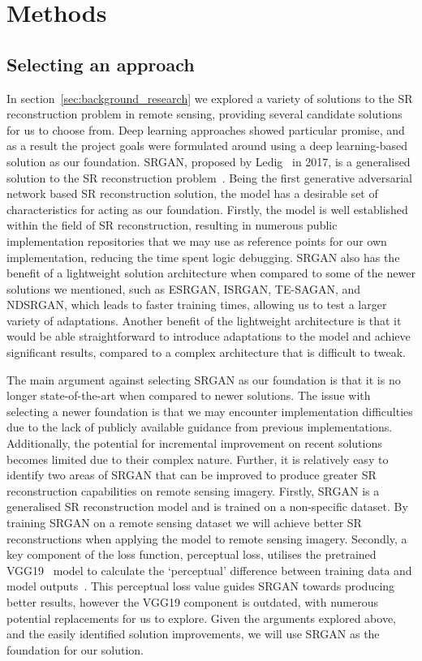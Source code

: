 \chapter{Methods}\label{chapter2}
\section{Selecting an approach}\label{sec:selecting_an_approach}
In section~\ref{sec:background_research} we explored a variety of solutions to the SR reconstruction problem in remote sensing, providing several candidate solutions for us to choose from. Deep learning approaches showed particular promise, and as a result the project goals were formulated around using a deep learning-based solution as our foundation. SRGAN, proposed by Ledig \etal\ in 2017, is a generalised solution to the SR reconstruction problem~\cite{srgan}. Being the first generative adversarial network based SR reconstruction solution, the model has a desirable set of characteristics for acting as our foundation. Firstly, the model is well established within the field of SR reconstruction, resulting in numerous public implementation repositories that we may use as reference points for our own implementation, reducing the time spent logic debugging. SRGAN also has the benefit of a lightweight solution architecture when compared to some of the newer solutions we mentioned, such as ESRGAN, ISRGAN, TE-SAGAN, and NDSRGAN, which leads to faster training times, allowing us to test a larger variety of adaptations. Another benefit of the lightweight architecture is that it would be able straightforward to introduce adaptations to the model and achieve significant results, compared to a complex architecture that is difficult to tweak.

The main argument against selecting SRGAN as our foundation is that it is no longer state-of-the-art when compared to newer solutions. The issue with selecting a newer foundation is that we may encounter implementation difficulties due to the lack of publicly available guidance from previous implementations. Additionally, the potential for incremental improvement on recent solutions becomes limited due to their complex nature. Further, it is relatively easy to identify two areas of SRGAN that can be improved to produce greater SR reconstruction capabilities on remote sensing imagery. Firstly, SRGAN is a generalised SR reconstruction model and is trained on a non-specific dataset. By training SRGAN on a remote sensing dataset we will achieve better SR reconstructions when applying the model to remote sensing imagery. Secondly, a key component of the loss function, perceptual loss, utilises the pretrained VGG19~\cite{vgg19} model to calculate the `perceptual' difference between training data and model outputs~\cite{srgan}. This perceptual loss value guides SRGAN towards producing better results, however the VGG19 component is outdated, with numerous potential replacements for us to explore. Given the arguments explored above, and the easily identified solution improvements, we will use SRGAN as the foundation for our solution.

